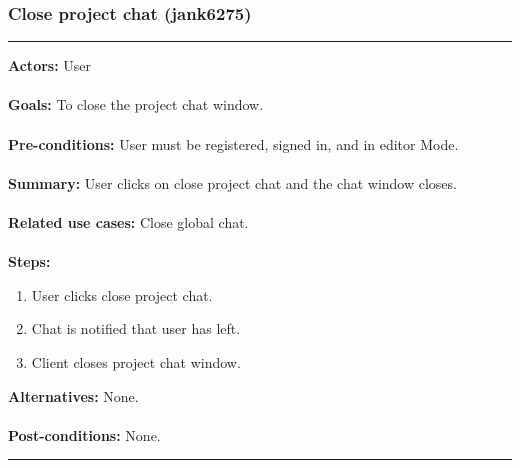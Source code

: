 \documentclass[11pt]{report}
\begin{document}
\subsubsection{Close project chat (jank6275)}
\vspace{2pt}
\hrule
\vspace{8pt}
 \textbf{Actors:} User \\ \\
\textbf{Goals:} To close the project chat window. \\ \\
 \textbf{Pre-conditions:} User must be registered, signed in, and in editor Mode.  \\ \\
 \textbf{Summary:} User clicks on close project chat and the chat window closes. \\ \\
\textbf{Related use cases:} Close global chat. \\ \\
\textbf{Steps:} \begin{enumerate}
  \item User clicks close project chat.
  \item Chat is notified that user has left.
  \item Client closes project chat window.
 \end{enumerate}
 \textbf{Alternatives:} None. \\ \\
 \textbf{Post-conditions:} None. \\
\vspace{8pt}
\hrule
\newpage
\end{document}
